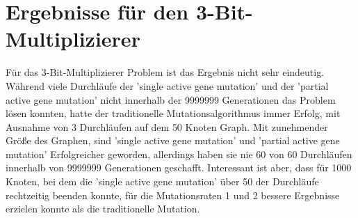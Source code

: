 

\section{Ergebnisse für den 3-Bit-Multiplizierer}

Für das 3-Bit-Multiplizierer Problem ist das Ergebnis nicht sehr eindeutig. Während viele Durchläufe der 'single active gene mutation' und der 'partial active gene mutation' nicht innerhalb der 9999999 Generationen das Problem lösen konnten, hatte der traditionelle Mutationsalgorithmus immer Erfolg, mit Ausnahme von 3 Durchläufen auf dem 50 Knoten Graph. Mit zunehmender Größe des Graphen, sind 'single active gene mutation' und 'partial active gene mutation' Erfolgreicher geworden, allerdings haben sie nie 60 von 60 Durchläufen innerhalb von 9999999 Generationen geschafft. Interessant ist aber, dass für 1000 Knoten, bei dem die 'single active gene mutation' über 50 der Durchläufe rechtzeitig beenden konnte, für die Mutationsraten 1 und 2 bessere Ergebnisse erzielen konnte als die traditionelle Mutation.

